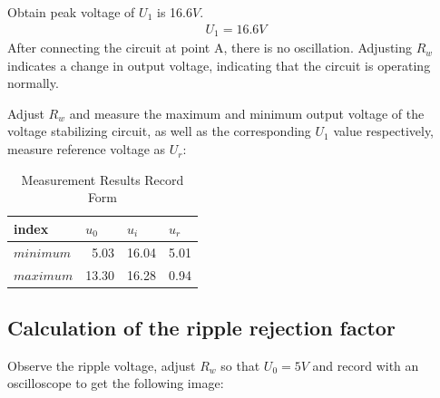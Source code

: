 \documentclass[UTF8]{article}
\begin{document}
   Obtain peak voltage of $U_1$ is 16.6$V$. 
   \begin{eqnarray}
   U_1 = 16.6V
   \end{eqnarray}
   After connecting the circuit at point A, there is no oscillation. Adjusting $R_w$ indicates a change in output voltage, indicating that the circuit is operating normally.
   
   Adjust $R_w$ and measure the maximum and minimum output voltage of the voltage stabilizing circuit, as well as the corresponding $U_1$ value respectively, measure reference voltage as $U_r$:
   
   \begin{table}[htbp]
     \centering
     \caption{Measurement Results Record Form}
       \begin{tabular}{lrrr}
       \toprule[2pt]
       index & \multicolumn{1}{l}{$u_0$} & \multicolumn{1}{l}{$u_i$} & \multicolumn{1}{l}{$u_r$}  \\
       \midrule
       $minimum$ & 5.03  & 16.04  & 5.01   \\
       $maximum$ & 13.30  & 16.28   & 0.94  \\
       \bottomrule[2pt]
       \end{tabular}%
     \label{tab:addlabel}%
   \end{table}%
   
       
   \subsection{Calculation of the ripple rejection factor}
   Observe the ripple voltage, adjust $R_w$ so that $U_0 = 5V$ and record with an oscilloscope to get the following image:
   
\end{document}
